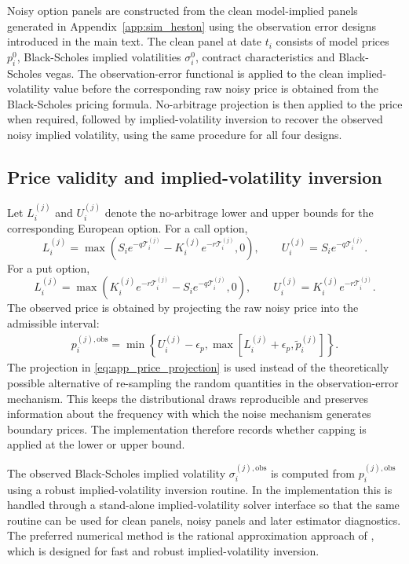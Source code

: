 \documentclass[11pt,a4paper,notitlepage]{article}
\numberwithin{equation}{section}
\begin{document}
Noisy option panels are constructed from the clean model-implied panels generated in Appendix~\ref{app:sim_heston} using the observation error designs introduced in the main text. The clean panel at date \(t_i\) consists of model prices \(p_i^0\), Black-Scholes implied volatilities \(\sigma_i^0\), contract characteristics and Black-Scholes vegas. The observation-error functional is applied to the clean implied-volatility value before the corresponding raw noisy price is obtained from the Black-Scholes pricing formula. No-arbitrage projection is then applied to the price when required, followed by implied-volatility inversion to recover the observed noisy implied volatility, using the same procedure for all four designs.


\subsection{Price validity and implied-volatility inversion}
Let $L_i^{(j)}$ and $U_i^{(j)}$ denote the no-arbitrage lower and upper bounds for the corresponding European
option. For a call option,
\[
L_i^{(j)}=\max\left(S_ie^{-q\mathcal T_i^{(j)}}-K_i^{(j)}e^{-r\mathcal T_i^{(j)}},0\right),
\qquad
U_i^{(j)}=S_ie^{-q\mathcal T_i^{(j)}}.
\]
For a put option,
\[
L_i^{(j)}=\max\left(K_i^{(j)}e^{-r\mathcal T_i^{(j)}}-S_ie^{-q\mathcal T_i^{(j)}},0\right),
\qquad
U_i^{(j)}=K_i^{(j)}e^{-r\mathcal T_i^{(j)}}.
\]
The observed price is obtained by projecting the raw noisy price into the admissible interval:
\begin{align}
p_i^{(j),\mathrm{obs}}
=
\min\left\{
U_i^{(j)}-\epsilon_p,
\max\left[
L_i^{(j)}+\epsilon_p,
\tilde p_i^{(j)}
\right]
\right\}.
\label{eq:app_price_projection}
\end{align}
The projection in \eqref{eq:app_price_projection} is used instead of the theoretically possible alternative of re-sampling the random quantities in the observation-error mechanism. This keeps the distributional
draws reproducible and preserves information about the frequency with which the noise mechanism generates boundary
prices. The implementation therefore records whether capping is applied at the lower or upper bound.

The observed Black-Scholes implied volatility $\sigma_i^{(j),\mathrm{obs}}$ is computed from
$p_i^{(j),\mathrm{obs}}$ using a robust implied-volatility inversion routine. In the implementation this is handled
through a stand-alone implied-volatility solver interface so that the same routine can be used for clean panels,
noisy panels and later estimator diagnostics. The preferred numerical method is the rational approximation
approach of \citet{jaeckel2015lets}, which is designed for fast and robust implied-volatility inversion.
\end{document}
